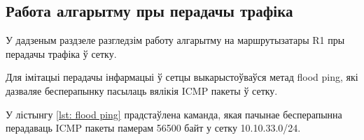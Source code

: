 

\subsection{Работа алгарытму пры перадачы трафіка}

У дадзеным раздзеле разгледзім работу алгарытму на маршрутызатары R1 пры
перадачы трафіка ў сетку.

Для імітацыі перадачы інфармацыі ў сетцы выкарыстоўваўся метад flood ping,
які дазваляе бесперапынку пасылаць вялікія ICMP пакеты ў сетку.

У лістынгу \ref{lst: flood ping} прадстаўлена каманда, якая пачынае 
бесперапынна перадаваць ICMP пакеты памерам 56500 байт у сетку 10.10.33.0/24.


